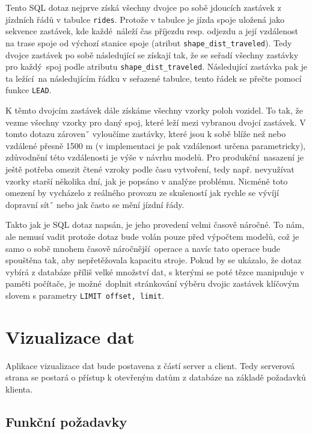 Tento SQL dotaz nejprve získá všechny dvojce po sobě jdoucích zastávek z jízdních řádů v tabulce \verb-rides-. Protože v tabulce je jízda spoje uložená jako sekvence zastávek, kde každé náleží čas příjezdu resp. odjezdu a její vzdálenost na trase spoje od výchozí stanice spoje (atribut \verb-shape_dist_traveled-). Tedy dvojce zastávek po sobě následující se získají tak, že se seřadí všechny zastávky pro každý spoj podle atributu \verb-shape_dist_traveled-. Následující zastávka pak je ta ležící na následujícím řádku v seřazené tabulce, tento řádek se přečte pomocí funkce \verb-LEAD-.

\bigbreak

K těmto dvojcím zastávek dále získáme všechny vzorky poloh vozidel. To tak, že vezme všechny vzorky pro daný spoj, které leží mezi vybranou dvojcí zastávek. V tomto dotazu zárovenˇ vyloučíme zastávky, které jsou k sobě blíže než nebo vzdálené přesně 1500 m (v implementaci je pak vzdálenost určena parametricky), zdůvodnění této vzdálenosti je výše v návrhu modelů. Pro produkční nasazení je ještě potřeba omezit čtené vzroky podle času vytvoření, tedy např. nevyužívat vzorky starší několika dní, jak je popsáno v analýze problému. Nicméně toto omezení by vycházelo z reálného provozu ze skušeností jak rychle se vývíjí dopravní sítˇ nebo jak často se mění jízdní řády.

\bigbreak

Takto jak je SQL dotaz napsán, je jeho provedení velmi časově náročné. To nám, ale nemusí vadit protože dotaz bude volán pouze před výpočtem modelů, což je samo o sobě mnohem časově náročnější operace a navíc tato operace bude spouštěna tak, aby nepřetěžovala kapacitu stroje. Pokud by se ukázalo, že dotaz vybírá z databáze příliš velké množství dat, s kterými se poté tězce manipuluje v paměti počítače, je možné doplnit stránkování výběru dvojic zastávek klíčovým slovem s parametry \verb-LIMIT offset, limit-.


\section{Vizualizace dat}

 Aplikace vizualizace dat bude postavena z částí server a client. Tedy serverová strana se postará o přístup k otevřeným datům z databáze na základě požadavků klienta.

\subsection{Funkční požadavky}

